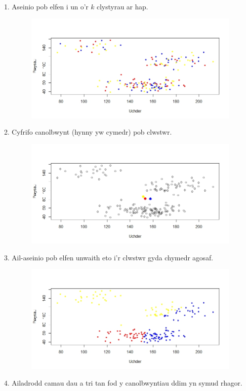 \begin{enumerate}
\item Aseinio pob elfen i un o'r $k$ clystyrau ar hap.

\begin{figure}[H]
\begin{center}
\includegraphics[width=0.5\linewidth]{../img/Cam1.jpeg}
\end{center}
\end{figure}

\item Cyfrifo canolbwynt (hynny yw cymedr) pob clwstwr.

\begin{figure}[H]
\begin{center}
\includegraphics[width=0.5\linewidth]{../img/ClystyrauCychwynol.jpeg}
\end{center}
\end{figure}

\item Ail-aseinio pob elfen unwaith eto i'r clwstwr gyda chymedr agosaf.

\begin{figure}[H]
\begin{center}
\includegraphics[width=0.5\linewidth]{../img/Cam3.jpeg}
\end{center}
\end{figure}

\item Ailadrodd camau dau a tri tan fod y canolbwyntiau ddim yn symud rhagor.


\end{enumerate}
